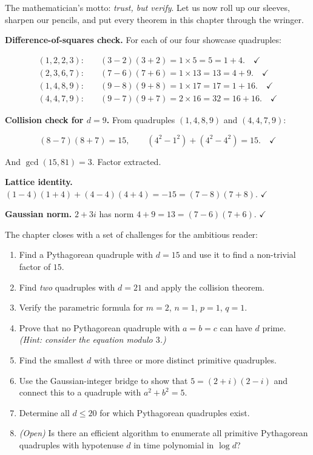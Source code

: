 The mathematician's motto: \emph{trust, but verify}. Let us now roll up our sleeves, sharpen our pencils, and put every theorem in this chapter through the wringer.

\textbf{Difference-of-squares check.} For each of our four showcase quadruples:

\[\begin{aligned}
(1,2,2,3): &\quad (3-2)(3+2) = 1 \times 5 = 5 = 1 + 4. \quad \checkmark \\
(2,3,6,7): &\quad (7-6)(7+6) = 1 \times 13 = 13 = 4 + 9. \quad \checkmark \\
(1,4,8,9): &\quad (9-8)(9+8) = 1 \times 17 = 17 = 1 + 16. \quad \checkmark \\
(4,4,7,9): &\quad (9-7)(9+7) = 2 \times 16 = 32 = 16 + 16. \quad \checkmark
\end{aligned}\]

\textbf{Collision check for \(d = 9\).} From quadruples \((1,4,8,9)\) and \((4,4,7,9)\):

\[(8-7)(8+7) = 15, \qquad (4^2 - 1^2) + (4^2 - 4^2) = 15. \quad \checkmark\]

And \(\gcd(15, 81) = 3\). Factor extracted.

\textbf{Lattice identity.} \((1-4)(1+4) + (4-4)(4+4) = -15 = (7-8)(7+8)\). \(\checkmark\)

\textbf{Gaussian norm.} \(2 + 3i\) has norm \(4 + 9 = 13 = (7-6)(7+6)\). \(\checkmark\)



The chapter closes with a set of challenges for the ambitious reader:

\begin{enumerate}
\def\labelenumi{\arabic{enumi}.}

\item
  Find a Pythagorean quadruple with \(d = 15\) and use it to find a non-trivial factor of \(15\).
\item
  Find \emph{two} quadruples with \(d = 21\) and apply the collision theorem.
\item
  Verify the parametric formula for \(m = 2\), \(n = 1\), \(p = 1\), \(q = 1\).
\item
  Prove that no Pythagorean quadruple with \(a = b = c\) can have \(d\) prime. \emph{(Hint: consider the equation modulo \(3\).)}
\item
  Find the smallest \(d\) with three or more distinct primitive quadruples.
\item
  Use the Gaussian-integer bridge to show that \(5 = (2 + i)(2 - i)\) and connect this to a quadruple with \(a^2 + b^2 = 5\).
\item
  Determine all \(d \le 20\) for which Pythagorean quadruples exist.
\item
  \emph{(Open)} Is there an efficient algorithm to enumerate all primitive Pythagorean quadruples with hypotenuse \(d\) in time polynomial in \(\log d\)?
\end{enumerate}


